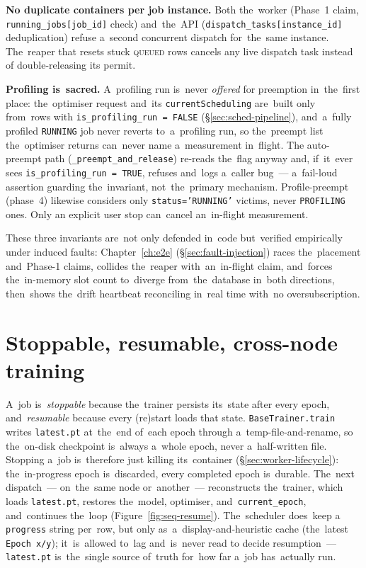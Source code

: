 \textbf{No duplicate containers per job instance.}  Both the~worker (Phase~1
claim, \texttt{running\_jobs[job\_id]} check) and~the~API
(\texttt{dispatch\_tasks[instance\_id]} deduplication) refuse a~second
concurrent dispatch for~the~same instance.  The~reaper that resets stuck
\textsc{queued} rows cancels any live dispatch task instead of
double-releasing its permit.

\textbf{Profiling is~sacred.}  A~profiling run is~never \emph{offered} for
preemption in~the~first place: the~optimiser request and~its
\texttt{currentScheduling} are~built only from~rows with
\texttt{is\_profiling\_run = FALSE} (\S\ref{sec:sched-pipeline}), and~a~fully
profiled \texttt{RUNNING} job never reverts to~a~profiling run, so the~preempt
list the~optimiser returns can~never name a~measurement in~flight.  The
auto-preempt path (\texttt{\_preempt\_and\_release}) re-reads the~flag anyway
and, if~it~ever sees \texttt{is\_profiling\_run = TRUE}, refuses and~logs
a~caller bug~--- a~fail-loud assertion guarding the~invariant, not~the~primary
mechanism.  Profile-preempt (phase~4) likewise considers only
\texttt{status='RUNNING'} victims, never \texttt{PROFILING} ones.  Only an
explicit user stop can~cancel an~in-flight measurement.

These three invariants are~not only defended in~code but~verified empirically
under induced faults: Chapter~\ref{ch:e2e} (\S\ref{sec:fault-injection}) races
the~placement and~Phase-1 claims, collides the~reaper with~an~in-flight claim,
and~forces the~in-memory slot count to~diverge from~the~database in~both
directions, then~shows the~drift heartbeat reconciling in~real time with~no
oversubscription.

\section{Stoppable, resumable, cross-node training}\label{sec:checkpoints}

A~job is~\emph{stoppable} because the~trainer persists its~state after
every epoch, and~\emph{resumable} because every (re)start loads that
state.  \texttt{BaseTrainer.train} writes \texttt{latest.pt} at~the~end
of~each epoch through a~temp-file-and-rename, so the~on-disk
checkpoint is~always a~whole epoch, never a~half-written file.  Stopping
a~job is~therefore just killing its~container
(\S\ref{sec:worker-lifecycle}): the~in-progress epoch is~discarded,
every completed epoch is~durable.  The~next dispatch~--- on~the~same node
or~another~--- reconstructs the~trainer, which loads \texttt{latest.pt},
restores the~model, optimiser, and~\texttt{current\_epoch}, and~continues
the~loop (Figure~\ref{fig:seq-resume}).  The~scheduler does~keep a
\texttt{progress} string per~row, but only as~a~display-and-heuristic cache
(the~latest \texttt{Epoch x/y}); it~is~allowed to~lag and~is~never read to
decide resumption~--- \texttt{latest.pt} is~the~single source of~truth for~how
far a~job has~actually run.

